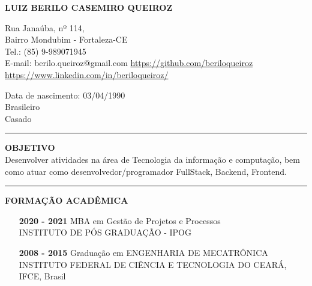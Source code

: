 \documentclass[12pt, a4paper]{article}
\newcommand{\LlinhaG}{2pt} %
\newcommand{\TlinhaG}{17cm}  %
\begin{document}

\begin{center}
	\fontsize{14}{14}
	\textbf{LUIZ BERILO CASEMIRO QUEIROZ}
\end{center}

\begin{multicols}{2}
	\begin{flushleft}
		Rua Janaúba, nº 114,\\
		Bairro Mondubim - Fortaleza-CE\\
		Tel.: (85) 9-989071945\\
		E-mail: berilo.queiroz@gmail.com
		\url{https://github.com/beriloqueiroz}
		\url{https://www.linkedin.com/in/beriloqueiroz/}
	\end{flushleft}
	\vfill
	\begin{flushright}
		Data de nascimento: 03/04/1990\\
		Brasileiro\\
		Casado\\
	\end{flushright}
\end{multicols}

\begin{center} %
	\rule{\TlinhaG}{\LlinhaG}
\end{center}

\begin{center}
	\textbf{OBJETIVO}\\
	Desenvolver atividades na área de Tecnologia da informação e computação, bem como atuar como desenvolvedor/programador FullStack, Backend, Frontend.
\end{center}

\begin{center}	%
	\rule{\TlinhaG}{\LlinhaG}
\end{center}


\begin{center}
	\textbf{FORMAÇÃO ACADÊMICA}\\
\end{center}
\begin{itemize}
	\item[\textbf{2020 - 2021}] MBA em Gestão de Projetos e Processos\\
		INSTITUTO DE PÓS GRADUAÇÃO - IPOG
	\item[\textbf{2008 - 2015}] Graduação em ENGENHARIA DE MECATRÔNICA\\
		INSTITUTO FEDERAL DE CIÊNCIA E TECNOLOGIA DO CEARÁ, IFCE, Brasil\\
\end{itemize}
\end{document}
